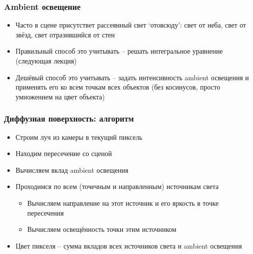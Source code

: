 \documentclass[10pt]{beamer}
\begin{document}
\begin{frame}[fragile]
\begin{center}
\end{center}
\end{frame}

\begin{frame}[fragile]
\frametitle{Ambient освещение}
\begin{itemize}
\item Часто в сцене присутствет рассеянный свет `отовсюду': свет от неба, свет от звёзд, свет отразившийся от стен
\pause
\item Правильный способ это учитывать -- решать интегральное уравнение (следующая лекция)
\pause
\item Дешёвый способ это учитывать -- задать интенсивность ambient освещения и применять его ко всем точкам всех объектов (без косинусов, просто умножением на цвет объекта)
\end{itemize}
\end{frame}

\begin{frame}[fragile]
\frametitle{Диффузная поверхность: алгоритм}
\begin{itemize}
\item Строим луч из камеры в текущий пиксель
\pause
\item Находим пересечение со сценой
\pause
\item Вычисляем вклад ambient освещения
\pause
\item Проходимся по всем (точечным и направленным) источникам света
\pause
\begin{itemize}
\item Вычисляем направление на этот источник и его яркость в точке пересечения
\pause
\item Вычисляем освещённость точки этим источником
\end{itemize}
\pause
\item Цвет пикселя -- сумма вкладов всех источников света и ambient освещения
\end{itemize}
\end{frame}
\end{document}

